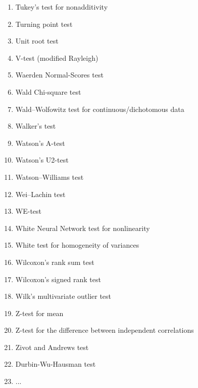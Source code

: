 \begin{itemize}
\begin{multicols}{3}
\begin{enumerate}
			\item Tukey's test for nonadditivity
			\item Turning point test
			\item Unit root test
			\item V-test (modified Rayleigh)
			\item Waerden Normal-Scores test
			\item Wald Chi-square test
			\item Wald–Wolfowitz test for continuous/dichotomous data
			\item Walker's test
			\item Watson's A-test
			\item Watson's U2-test
			\item Watson–Williams test
			\item Wei–Lachin test
			\item WE-test
			\item White Neural Network test for nonlinearity
			\item White test for homogeneity of variances 
			\item Wilcoxon's rank sum test
			\item Wilcoxon's signed rank test
			\item Wilk's multivariate outlier test
			\item Z-test for mean
			\item Z-test for the difference between independent correlations
			\item Zivot and Andrews test
			\item Durbin-Wu-Hausman test
			\item ...
		\end{enumerate}
		\end{multicols}
		

\end{itemize}
